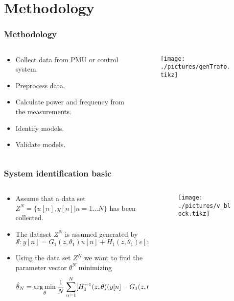 \section{Methodology}
\begin{frame}
	\frametitle{Methodology}
	\begin{columns}
		\begin{column}{0.4\textwidth}
			\begin{itemize}
				\item Collect data from PMU or control system.
				\item Preprocess data.
				\item Calculate power and frequency from the measurements.
				\item Identify models.
				\item Validate models.
			\end{itemize}
		\end{column}
		\begin{column}{0.6\textwidth}
			\begin{figure}
				\texttt{[image: ./pictures/genTrafo.tikz]}
			\end{figure}
		\end{column}
	\end{columns}
\end{frame}
\begin{frame}
	\frametitle{System identification basic}
	\begin{columns}
		\begin{column}{0.5\textwidth}
			\begin{itemize}
				\item Assume that a data set $Z^N = \{u[n],y[n]|n=1\ldots N\}$ has been collected.
				\item The dataset $Z^N$ is assumed generated by
					\begin{equation*}
						\mathcal{S}: y[n] = G_1(z,\theta_1)u[n] + H_1(z,\theta_1)e[n]
					\end{equation*}
				\item Using the data set $Z^N$ we want to find the parameter vector $\theta^N$ minimizing
\begin{equation*}
		\hat{\theta}_N = \operatorname*{arg\,min}_{\theta} \frac{1}{N}\sum_{n=1}^N[ H_1^{-1}(z,\theta)(y[n]-G_1(z,\theta)u[n])]^2
\end{equation*}
			\end{itemize}
		\end{column}
		\begin{column}{0.5\textwidth}
			\begin{figure}
				\texttt{[image: ./pictures/v\_block.tikz]}
			\end{figure}
		\end{column}
	\end{columns}
\end{frame}
